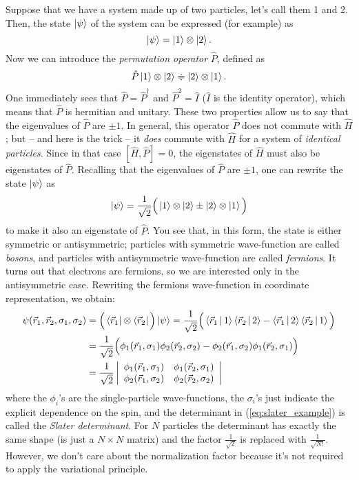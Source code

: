 Suppose that we have a system made up of two particles, let's call them 1 and 2. Then, the state $\Ket{\psi}$ of the system can be expressed (for example) as
\begin{equation}
	\Ket{\psi} = \Ket{1} \otimes \Ket{2}.
\end{equation}
Now we can introduce the \emph{permutation operator} $\hat{P}$, defined as
\begin{equation}
	\hat{P} \Ket{1} \otimes \Ket{2} \doteqdot \Ket{2} \otimes \Ket{1}.
\end{equation}
One immediately sees that $\hat{P} = \hat{P}^{\dagger}$ and $\hat{P}^2 = \hat{I}$ ($\hat{I}$ is the identity operator), which means that $\hat{P}$ is hermitian and unitary. These two properties allow us to say that the eigenvalues of $\hat{P}$ are $\pm 1$. In general, this operator $\hat{P}$ does not commute with $\hat{H}$; but -- and here is the trick -- it \emph{does} commute with $\hat{H}$ for a system of \emph{identical particles}. Since in that case $[\hat{H},\hat{P}] = 0$, the eigenstates of $\hat{H}$ must also be eigenstates of $\hat{P}$. Recalling that the eigenvalues of $\hat{P}$ are $\pm 1$, one can rewrite the state $\Ket{\psi}$ as
\begin{equation}
	\Ket{\psi} = \frac{1}{\sqrt{2}} \Big( \Ket{1} \otimes \Ket{2} \pm \Ket{2} \otimes \Ket{1} \Big)
	\label{eq:identical_particles}
\end{equation}
to make it also an eigenstate of $\hat{P}$. You see that, in this form, the state is either symmetric or antisymmetric; particles with symmetric wave-function are called \emph{bosons}, and particles with antisymmetric wave-function are called \emph{fermions}. It turns out that electrons are fermions, so we are interested only in the antisymmetric case. Rewriting the fermions wave-function in coordinate representation, we obtain:
\begin{align}
	\psi(\vec{r}_1,\vec{r}_2,\sigma_1,\sigma_2) 
	&= \Big( \Bra{\vec{r}_1} \otimes \Bra{\vec{r}_2} \Big) \Ket{\psi}
	= \frac{1}{\sqrt{2}} \Big( \Braket{\vec{r}_1|1}\Braket{\vec{r}_2|2} - \Braket{\vec{r}_1|2}\Braket{\vec{r}_2|1} \Big) \\
	&= \frac{1}{\sqrt{2}} \Big( \phi_1(\vec{r}_1,\sigma_1)\phi_2(\vec{r}_2,\sigma_2) - \phi_2(\vec{r}_1,\sigma_2)\phi_1(\vec{r}_2,\sigma_1) \Big) \\
	&= \frac{1}{\sqrt{2}} \left\lvert
	\begin{array}{cc}
		\phi_1(\vec{r}_1,\sigma_1) & \phi_1(\vec{r}_2,\sigma_1) \\
		\phi_2(\vec{r}_1,\sigma_2) & \phi_2(\vec{r}_2,\sigma_2)
	\end{array}
	\right\lvert
	\label{eq:slater_example}
\end{align}
where the $\phi_i$'s are the single-particle wave-functions, the $\sigma_i$'s just indicate the explicit dependence on the spin, and the determinant in (\ref{eq:slater_example}) is called the \emph{Slater determinant}. For $N$ particles the determinant has exactly the same shape (is just a $N \times N$ matrix) and the factor $\frac{1}{\sqrt{2}}$ is replaced with $\frac{1}{\sqrt{N!}}$. However, we don't care about the normalization factor because it's not required to apply the variational principle.

